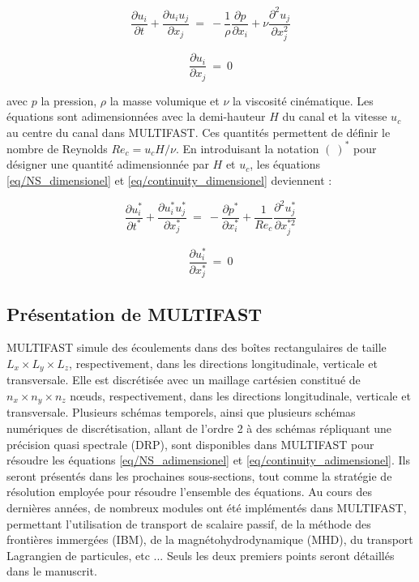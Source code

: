 \begin{equation}
    \frac{\partial u_{i}}{\partial t} + \frac{\partial u_{i} u_{j}}{\partial x_{j}}~=~-\frac{1}{\rho} \frac{\partial p}{\partial x_{i}}+ \nu \frac{\partial ^{2} u_{j}}{\partial x_{j}^{2}}
    \label{eq/NS_dimensionel}
\end{equation}

\begin{equation}
    \frac{\partial u_{i}}{\partial x_{j}}~=~0
    \label{eq/continuity_dimensionel}
\end{equation}

avec $p$ la pression, $\rho$ la masse volumique et $\nu$ la viscosité cinématique. Les équations sont adimensionnées avec la demi-hauteur $H$ du canal et la vitesse $u_{c}$ au centre du canal dans MULTIFAST. Ces quantités permettent de définir le nombre de Reynolds $Re_{c}={u_{c} H}/{\nu}$. En introduisant la notation $(~)^{*}$ pour désigner une quantité adimensionnée par $H$ et $u_{c}$, les équations \ref{eq/NS_dimensionel} et \ref{eq/continuity_dimensionel} deviennent :

\begin{equation}
    \frac{\partial u_{i}^{*}}{\partial t^{*}} + \frac{\partial u_{i}^{*} u_{j}^{*}}{\partial x_{j}^{*}}~=~-\frac{\partial p^{*}}{\partial x_{i}^{*}}+\frac{1}{Re_{c}} \frac{\partial ^{2} u_{j}^{*}}{\partial x_{j}^{* 2}}
    \label{eq/NS_adimensionel}
\end{equation}

\begin{equation}
    \frac{\partial u_{i}^{*}}{\partial x_{j}^{*}}~=~0
    \label{eq/continuity_adimensionel}
\end{equation}

\subsection{Présentation de MULTIFAST}

MULTIFAST simule des écoulements dans des boîtes rectangulaires de taille $L_{x} \times L_{y} \times L_{z}$, respectivement, dans les directions longitudinale, verticale et transversale. Elle est discrétisée avec un maillage cartésien constitué de $n_{x} \times n_{y} \times n_{z}$ nœuds, respectivement, dans les directions longitudinale, verticale et transversale. Plusieurs schémas temporels, ainsi que plusieurs schémas numériques de discrétisation, allant de l'ordre 2 à des schémas répliquant une précision quasi spectrale (DRP), sont disponibles dans MULTIFAST pour résoudre les équations \ref{eq/NS_adimensionel} et \ref{eq/continuity_adimensionel}. Ils seront présentés dans les prochaines sous-sections, tout comme la stratégie de résolution employée pour résoudre l'ensemble des équations. Au cours des dernières années, de nombreux modules ont été implémentés dans MULTIFAST, permettant l'utilisation de transport de scalaire passif, de la méthode des frontières immergées (IBM), de la magnétohydrodynamique (MHD), du transport Lagrangien de particules, etc ... Seuls les deux premiers points seront détaillés dans le manuscrit.\\

